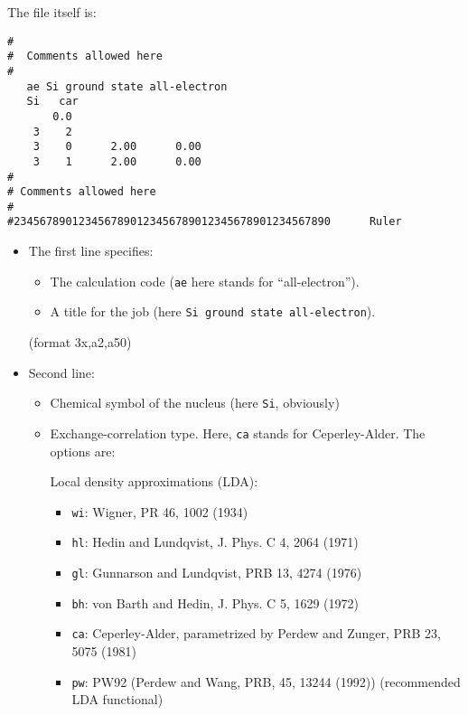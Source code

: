 \documentclass[11pt]{article}
\begin{document}
The file itself is:
\begin{verbatim}
#
#  Comments allowed here
#
   ae Si ground state all-electron
   Si   car  
       0.0
    3    2
    3    0      2.00      0.00
    3    1      2.00      0.00
#
# Comments allowed here
#
#2345678901234567890123456789012345678901234567890      Ruler
\end{verbatim}

\begin{itemize}
\item The first line specifies:
	\begin{itemize}
	\item The calculation code ({\tt ae} here stands for ``all-electron'').
	\item A title for the job (here {\tt Si ground state all-electron}).
	\end{itemize} 
	(format 3x,a2,a50)

\item Second line:
	\begin{itemize}

	\item Chemical symbol of the nucleus (here {\tt Si}, obviously)
	\item Exchange-correlation type. Here, {\tt ca} stands for
          Ceperley-Alder. The options are:

          Local density approximations (LDA):
          \begin{itemize}
            \item {\tt wi}: Wigner, PR 46, 1002 (1934)
            \item {\tt hl}: Hedin and Lundqvist, J. Phys. C 4, 2064 (1971)
            \item {\tt gl}: Gunnarson and Lundqvist, PRB 13, 4274 (1976)
            \item {\tt bh}: von Barth and Hedin, J. Phys. C 5, 1629 (1972)
            \item {\tt ca}: Ceperley-Alder, parametrized by Perdew and Zunger,
                            PRB 23, 5075 (1981)
            \item {\tt pw}: PW92 (Perdew and Wang, PRB, 45, 13244 (1992))
                            (recommended LDA functional)
          \end{itemize}


\end{itemize}
\end{itemize}
\end{document}
